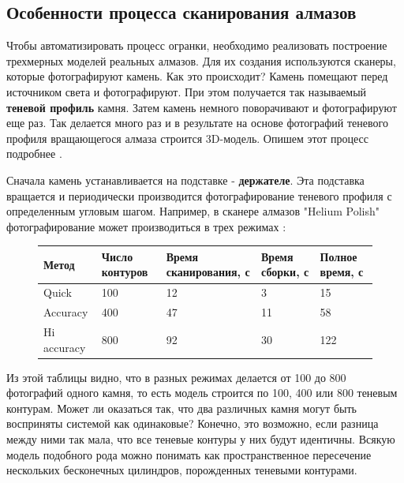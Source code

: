 \documentclass[a4paper,12pt, titlepage]{article}
\begin{document}
\subsection{Особенности процесса сканирования алмазов}
\begin{flushleft}
Чтобы автоматизировать процесс огранки, необходимо реализовать построение трехмерных моделей
реальных алмазов. Для их создания используются сканеры, которые фотографируют камень. 
Как это происходит? Камень помещают перед источником света и фотографируют. При этом получается
так называемый \textbf{теневой профиль} камня. Затем камень немного поворачивают и фотографируют 
еще раз. Так делается много раз и в результате на основе фотографий теневого профиля вращающегося
алмаза строится 3D-модель. Опишем этот процесс подробнее \cite{doc-1}.
\end{flushleft}
\begin{flushleft}
 Сначала камень устанавливается на подставке - \textbf{держателе}. Эта подставка вращается и 
периодически производится фотографирование теневого профиля с определенным угловым шагом. Например, в 
сканере алмазов "Helium Polish" фотографирование может производиться в трех режимах \cite{doc-2}:
\end{flushleft}
\begin{flushleft}
\begin{figure}
 \begin{tabular}{|p{2.5cm}|p{2.5cm}|p{2.5cm}|p{2.5cm}|p{2.5cm}|}
  \hline
  Метод & Число контуров & Время сканирования, с & Время сборки, с & Полное время, с  \\
  \hline
  Quick & 100 & 12 & 3 & 15 \\
  \hline
  Accuracy & 400 & 47 & 11 & 58 \\
  \hline
  Hi accuracy & 800 & 92 & 30 & 122 \\
  \hline
 \end{tabular}
\end{figure}

 
\end{flushleft}
\begin{flushleft}
 Из этой таблицы видно, что в разных режимах делается от 100 до 800 фотографий одного камня, то есть
модель строится по 100, 400 или 800 теневым контурам. Может ли оказаться так, что два различных камня 
могут быть восприняты системой как одинаковые? Конечно, это возможно, если разница между ними так мала,
что все теневые контуры у них будут идентичны. Всякую модель подобного рода можно понимать как 
пространственное пересечение нескольких бесконечных цилиндров, порожденных теневыми контурами.
\end{flushleft}
\end{document}
